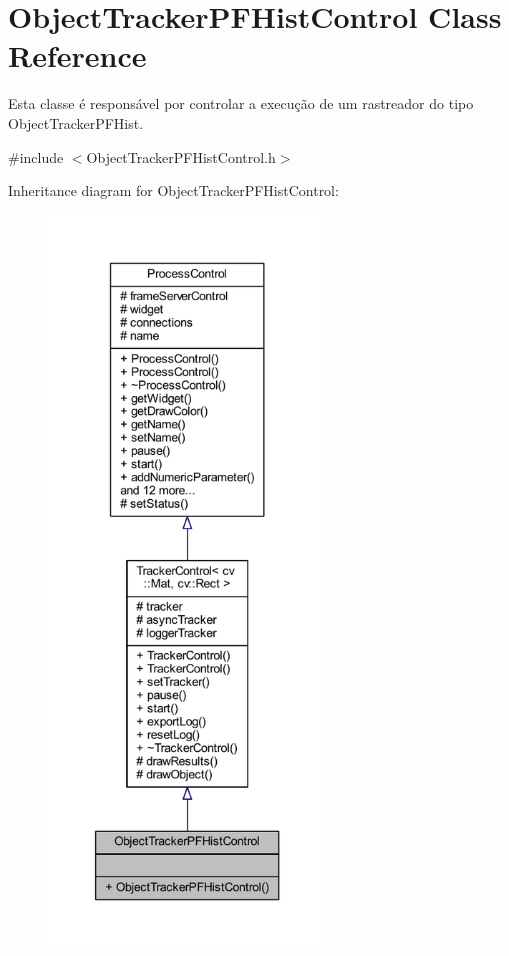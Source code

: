 \hypertarget{class_object_tracker_p_f_hist_control}{}\section{Object\+Tracker\+P\+F\+Hist\+Control Class Reference}
\label{class_object_tracker_p_f_hist_control}


Esta classe é responsável por controlar a execução de um rastreador do tipo Object\+Tracker\+P\+F\+Hist.  




{\ttfamily \#include $<$Object\+Tracker\+P\+F\+Hist\+Control.\+h$>$}



Inheritance diagram for Object\+Tracker\+P\+F\+Hist\+Control\+:
\nopagebreak
\begin{figure}[H]
\begin{center}
\leavevmode
\includegraphics[height=550pt]{class_object_tracker_p_f_hist_control__inherit__graph}
\end{center}
\end{figure}


